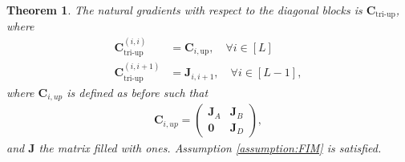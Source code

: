 \documentclass[a4paper, 11pt, oneside]{scrartcl}
\theoremstyle{break}
\newtheorem{theorem}[lemma]{Theorem}
\newcommand{\matr}[1]{\boldsymbol{#1}}
\numberwithin{equation}{section}
\begin{document}
				\begin{theorem}
					The natural gradients with respect to the diagonal blocks is $\matr{C}_{\text{tri-up}}$, where
					\begin{align*}
						\matr{C}_{\text{tri-up}}^{(i, i)} &= \matr{C}_{i, \text{up}}, \quad \forall i \in [L] \\
						\matr{C}_{\text{tri-up}}^{(i, i+1)} &= \matr{J}_{i, i+1}, \quad \forall i \in [L-1],
					\end{align*}
					where $\matr{C}_{i, up}$ is defined as before such that 
					\begin{align*}
						\matr{C}_{i, up} = \begin{pmatrix} \matr{J}_A & \matr{J}_B \\ \matr{0} & \matr{J}_D \end{pmatrix},
					\end{align*}
					and $\matr{J}$ the matrix filled with ones. 
					Assumption \ref{assumption:FIM} is satisfied.
				\end{theorem}
\end{document}

